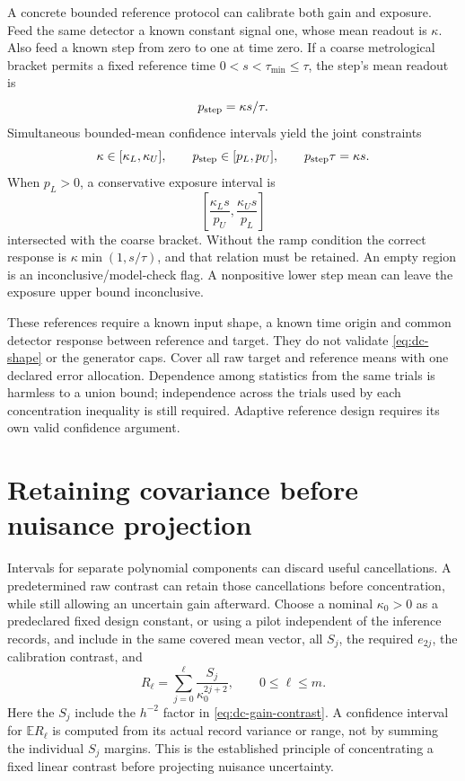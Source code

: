 A concrete bounded reference protocol can calibrate both gain and exposure.
Feed the same detector a known constant signal one, whose mean readout is
$\kappa$.  Also feed a known step from zero to one at time zero.  If a
coarse metrological bracket permits a fixed reference time
$0<s<\tau_{\min}\le\tau$, the step's mean readout is
\begin{equation}
 p_{\rm step}=\kappa s/\tau.
 \label{eq:dc-step}
\end{equation}
Simultaneous bounded-mean confidence intervals yield the joint constraints
\[
 \kappa\in[\kappa_L,\kappa_U],\qquad
 p_{\rm step}\in[p_L,p_U],\qquad p_{\rm step}\tau=\kappa s.
\]
When $p_L>0$, a conservative exposure interval is
\begin{equation}
 \left[\frac{\kappa_Ls}{p_U},\frac{\kappa_Us}{p_L}\right]
 \label{eq:dc-shutter-region}
\end{equation}
intersected with the coarse bracket.  Without the ramp condition the correct
response is $\kappa\min(1,s/\tau)$, and that relation must be retained.
An empty region is an inconclusive/model-check flag.  A nonpositive lower
step mean can leave the exposure upper bound inconclusive.

These references require a known input shape, a known time origin and common
detector response between reference and target.  They do not validate
\eqref{eq:dc-shape} or the generator caps.  Cover all raw target and reference
means with one declared error allocation.  Dependence among statistics from
the same trials is harmless to a union bound; independence across the trials
used by each concentration inequality is still required.  Adaptive reference
design requires its own valid confidence argument.

\section{Retaining covariance before nuisance projection}

Intervals for separate polynomial components can discard useful cancellations.
A predetermined raw contrast can retain those cancellations before concentration,
while still allowing an uncertain gain afterward.  Choose a nominal
$\kappa_0>0$ as a predeclared fixed design constant, or using a pilot
independent of the inference records, and include in the same covered mean
vector, all $S_j$, the required $e_{2j}$, the calibration contrast, and
\begin{equation}
 R_\ell=\sum_{j=0}^{\ell}\frac{S_j}{\kappa_0^{2j+2}},
 \qquad 0\le\ell\le m.
 \label{eq:dc-predetermined-contrast}
\end{equation}
Here the $S_j$ include the $h^{-2}$ factor in
\eqref{eq:dc-gain-contrast}.  A confidence interval for $\mathbb ER_\ell$
is computed from its actual record variance or range, not by summing the
individual $S_j$ margins.  This is the established principle of concentrating
a fixed linear contrast before projecting nuisance uncertainty.

